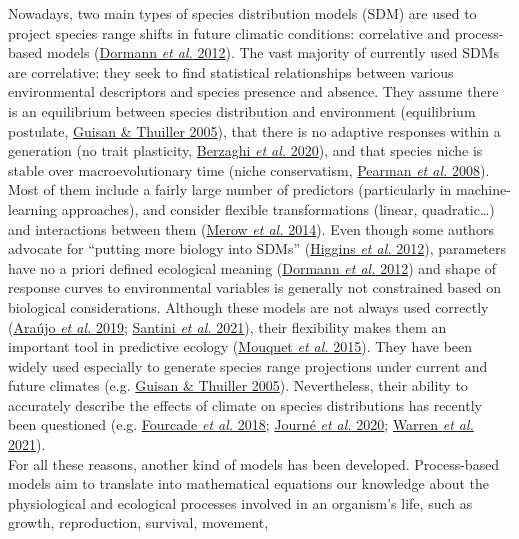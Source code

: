 \documentclass[11pt,]{article}
\begin{document}
Nowadays, two main types of species distribution models (SDM) are used
to project species range shifts in future climatic conditions:
correlative and process-based models
(\protect\hyperlink{ref-Dormann2012}{Dormann \emph{et al.} 2012}). The
vast majority of currently used SDMs are correlative: they seek to find
statistical relationships between various environmental descriptors and
species presence and absence. They assume there is an equilibrium
between species distribution and environment (equilibrium postulate,
\protect\hyperlink{ref-Guisan2005}{Guisan \& Thuiller 2005}), that there
is no adaptive responses within a generation (no trait plasticity,
\protect\hyperlink{ref-Berzaghi2020}{Berzaghi \emph{et al.} 2020}), and
that species niche is stable over macroevolutionary time (niche
conservatism, \protect\hyperlink{ref-Pearman2008}{Pearman \emph{et al.}
2008}). Most of them include a fairly large number of predictors
(particularly in machine-learning approaches), and consider flexible
transformations (linear, quadratic\ldots) and interactions between them
(\protect\hyperlink{ref-Merow2014}{Merow \emph{et al.} 2014}). Even
though some authors advocate for ``putting more biology into SDMs''
(\protect\hyperlink{ref-Higgins2012}{Higgins \emph{et al.} 2012}),
parameters have no a priori defined ecological meaning
(\protect\hyperlink{ref-Dormann2012}{Dormann \emph{et al.} 2012}) and
shape of response curves to environmental variables is generally not
constrained based on biological considerations. Although these models
are not always used correctly (\protect\hyperlink{ref-Araujo2019}{Araújo
\emph{et al.} 2019}; \protect\hyperlink{ref-Santini2021}{Santini
\emph{et al.} 2021}), their flexibility makes them an important tool in
predictive ecology (\protect\hyperlink{ref-Mouquet2015}{Mouquet \emph{et
al.} 2015}). They have been widely used especially to generate species
range projections under current and future climates (e.g.
\protect\hyperlink{ref-Guisan2005}{Guisan \& Thuiller 2005}).
Nevertheless, their ability to accurately describe the effects of
climate on species distributions has recently been questioned (e.g.
\protect\hyperlink{ref-Fourcade2018}{Fourcade \emph{et al.} 2018};
\protect\hyperlink{ref-Journe2020}{Journé \emph{et al.} 2020};
\protect\hyperlink{ref-Warren2021}{Warren \emph{et al.} 2021}).\\
For all these reasons, another kind of models has been developed.
Process-based models aim to translate into mathematical equations our
knowledge about the physiological and ecological processes involved in
an organism's life, such as growth, reproduction, survival, movement,
\end{document}
